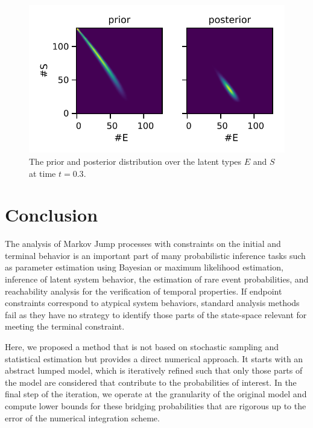 \begin{figure}
	\centering
    \includegraphics[width=.5\linewidth]{gfx/prior_posterior.pdf}
	\caption[Prior and posterior latent distribution (\ac{SEIR})]{\label{fig:latent}
	    The prior and posterior distribution over the latent types $E$ and $S$ at time $t=0.3$.}
\end{figure}

\section{Conclusion}
The analysis of Markov Jump processes with constraints on the initial and terminal behavior is an important part of many probabilistic inference tasks such as parameter estimation using Bayesian or maximum likelihood estimation, inference of latent system behavior, the estimation of rare event probabilities, and reachability analysis for the verification of temporal properties.  
If endpoint constraints correspond to atypical system behaviors, 
standard analysis methods fail
as they have no strategy to identify those parts of the state-space relevant for meeting the terminal constraint. 


Here, we proposed a method that is not based on stochastic sampling and statistical estimation 
but provides a direct numerical approach.
It starts with an abstract lumped model, which is iteratively refined such that only those parts of the model are considered that contribute to the  
probabilities of interest.
In the final step of the iteration, we operate at the granularity of the original model and compute lower bounds for these bridging probabilities that are rigorous up to the error of the numerical integration scheme.

